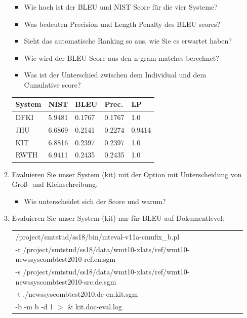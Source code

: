 \documentclass[12pt,fleqn]{article}
\begin{document}
\begin{enumerate}
\begin{enumerate}
\vspace{0.5cm} 
\begin{itemize} 
\item Wie hoch ist der BLEU und NIST Score für die vier Systeme?
\item Was bedeuten Precision und Length Penalty des BLEU scores?
\item Sieht das automatische Ranking so aus, wie Sie es erwartet haben?
\item Wie wird der BLEU Score aus den n-gram matches berechnet?
\item Was ist der Unterschied zwischen dem Individual und dem Cumulative score?
\end{itemize} 

\begin{table}[h] 
 \begin{center} 
\begin{tabular}{|p{2cm}|p{2.5cm}|p{2.5cm}|p{2.5cm}|p{2.5cm}|} \hline 
 System & NIST & BLEU & Prec. & LP \\  \hline 
DFKI & 5.9481 & 0.1767 & 0.1767  & 1.0 \\ \hline 
JHU & 6.6869 & 0.2141 & 0.2274 & 0.9414 \\ \hline 
KIT & 6.8816 & 0.2397 & 0.2397 & 1.0  \\ \hline 
RWTH & 6.9411 & 0.2435  & 0.2435 & 1.0 \\ \hline 
\end{tabular}
 \end{center}
\end{table}

\vspace{0.5cm} 
\item Evaluieren Sie unser System (kit) mit der Option mit Unterscheidung von Groß- und Kleinschreibung.

\vspace{0.5cm} 
\begin{itemize} 
\item Wie unterscheidet sich der Score und warum?
\end{itemize} 

\vspace{0.5cm} 
\item Evaluieren Sie unser System (kit) nur für BLEU auf Dokumentlevel:

\begin{table}[h] 
 \begin{center} 
\begin{tabular}{l} 
/project/smtstud/ss18/bin/mteval-v11a-cmufix\_b.pl  \\ 
-r /project/smtstud/ss18/data/wmt10-xlats/ref/wmt10-newssyscombtest2010-ref.en.sgm  \\ 
-s /project/smtstud/ss18/data/wmt10-xlats/ref/wmt10-newssyscombtest2010-src.de.sgm  \\ 
-t ./newssyscombtest2010.de-en.kit.sgm  \\ 
-b -m b -d 1    $>$ \&  kit.doc-eval.log \\ 
\end{tabular}
 \end{center}
\end{table}



\end{enumerate}
\end{enumerate}
\end{document}
